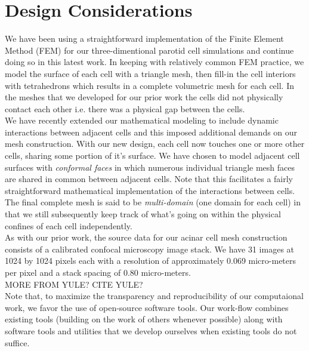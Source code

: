 \documentclass[a4paper,10pt]{article}
\begin{document}
\section{Design Considerations}
We have been using a straightforward implementation of the Finite Element Method (FEM) \cite{gockenbach2006understanding,Hughes2000,gosz2005finite} for our three-dimentional parotid cell simulations and continue doing so in this latest work. In keeping with relatively common FEM practice, we model the surface of each cell with a triangle mesh, then fill-in the cell interiors with tetrahedrons which results in a complete volumetric mesh for each cell. In the meshes that we developed for our prior work the cells did not physically contact each other i.e. there was a physical gap between the cells.\\

We have recently extended our mathematical modeling to include dynamic interactions between adjacent cells and this imposed additional demands on our mesh construction. With our new design, each cell now touches one or more other cells, sharing some portion of it's surface. We have chosen to model adjacent cell surfaces with \emph{conformal faces} in which numerous individual triangle mesh faces are shared in common between adjacent cells. Note that this facilitates a fairly straightforward mathematical implementation of the interactions between cells. The final complete mesh is said to be \emph{multi-domain} (one domain for each cell) in that we still subsequently keep track of what's going on within the physical confines of each cell independently. \\

As with our prior work, the source data for our acinar cell mesh construction consists of a calibrated confocal microscopy image stack. We have 31 images at 1024 by 1024 pixels each with a resolution of approximately 0.069 micro-meters per pixel and a stack spacing of 0.80 micro-meters. \\ 

MORE FROM YULE? CITE YULE?\\

Note that, to maximize the transparency and reproducibility of our computaional work, we favor the use of open-source software tools. Our work-flow combines existing tools (building on the work of others whenever possible) along with software tools and utilities that we develop ourselves when existing tools do not suffice.\\
\end{document}
